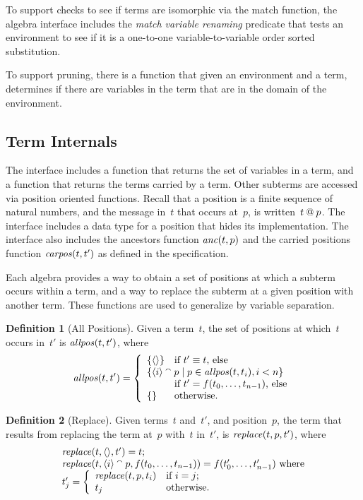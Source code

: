 \documentclass[12pt]{report}
\theoremstyle{definition}
\newtheorem{defn}{Definition}[chapter]
\begin{document}
To support checks to see if terms are isomorphic via the match
function, the algebra interface includes the \emph{match variable
  renaming} predicate that tests an environment to see if it is a
one-to-one variable-to-variable order sorted substitution.

To support pruning, there is a function that given an environment and
a term, determines if there are variables in the term that are in the
domain of the environment.

\subsection{Term Internals}\label{sec:term internals}

The interface includes a function that returns the set of variables in
a term, and a function that returns the terms carried by a term.
Other subterms are accessed via position oriented
functions.  Recall that a position is a finite sequence of natural
numbers, and the message in~$t$ that occurs at~$p$, is
written~$t\mathbin{@} p$.  The interface includes a data type for a
position that hides its implementation.  The interface also includes
the ancestors function $\operatorname{\mathit{anc}}(t,p)$ and the carried positions
function $\operatorname{\mathit{carpos}}(t,t')$ as defined in the specification.

Each algebra provides a way to obtain a set of positions at which a
subterm occurs within a term, and a way to replace the subterm at a
given position with another term.  These functions are used to
generalize by variable separation.

\begin{defn}[All Positions]
Given a term~$t$, the set of positions at which~$t$ occurs in~$t'$ is
$\operatorname{\mathit{allpos}}(t,t')$, where
$$\fn{allpos}(t,t')=\left\{
\begin{array}{ll}
\{\seq{}\}&\mbox{if $t'\equiv t$, else}\\
\multicolumn{2}{l}{\{\seq{i}\append p \mid
p\in\fn{allpos}(t,t_i),i<n\}} \\
& \mbox{if $t'=f(t_0,\ldots,t_{n-1})$, else}\\
\{\}&\mbox{otherwise.}
\end{array}\right.$$
\end{defn}

\begin{defn}[Replace]
Given terms~$t$ and~$t'$, and position~$p$, the term that results from
replacing the term at~$p$ with~$t$ in~$t'$, is
$\operatorname{\mathit{replace}}(t,p,t')$, where
$$\begin{array}{l}
\operatorname{\mathit{replace}}(t,\langle\rangle,t')=t;\\
\operatorname{\mathit{replace}}(t,\langle i\rangle\mathbin{{}^\smallfrown} p,f(t_0,\ldots,t_{n-1}))=
f(t'_0,\ldots,t'_{n-1})\mbox{ where}\\
t'_j=\left\{
\begin{array}{ll}
\operatorname{\mathit{replace}}(t,p,t_i)&\mbox{if $i=j$;}\\
t_j&\mbox{otherwise.}
\end{array}\right.
\end{array}$$
\end{defn}
\end{document}
